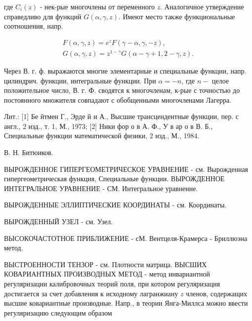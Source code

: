 \documentclass[10pt]{article}
\begin{document}
где $C_{i}(z)$ - нек-рые многочлены от переменного $z$. Аналогичное утверждение справедливо для функций $G(\alpha, \gamma, z)$. Имеют место также функциональные соотношения, напр.



\[

\begin{gathered}

F(\alpha, \gamma, z)=e^{z} F(\gamma-\alpha, \gamma,-z), \\

G(\alpha, \gamma, z)=z^{1-\gamma} G(\alpha-\gamma+1,2-\gamma, z) .

\end{gathered}

\]



Через В. г. ф. выражаются многие элементарные и специальные функции, напр. цилиндрич. функции, интегральные функции. При $\alpha=-n$, где $n-$ целое положительное число, В. г. Ф. сводятся к многочленам, к-рые с точностью до постоянного множителя совпадают с обобщенными многочленами Лагерра.



Лит.: [1] Бе йтмен Г., Эрде й и А., Высшие трансцендентные функции, пер. с англ., 2 изд., т. 1, М., 1973; [2] Ники фор о в А. Ф., У в ар о в В. Б., Специальные функции математической физики, 2 изд., М., 1984.



В. Н. Битюиков.



ВЫРОЖДЕННОЕ ГИПЕРГЕОМЕТРИЧЕСКОЕ УРАВНЕНИЕ - см. Вырожденная гипергеометрическая функция, Специальные функции. ВЫРОЖДЕННОЕ ИНТЕГРАЛЬНОЕ УРАВНЕНИЕ - СМ. Интегральное уравнение.



ВЫРОЖДЕННЫЕ ЭЛЛИПТИЧЕСКИЕ КООРДИНАТЫ - см. Координаты.



ВЫРОЖДЕННЫЙ УЗЕЛ - см. Узел.



ВЫСОКОЧАСТОТНОЕ ПРИБЛИЖЕНИЕ - сМ. Вентцеля-Крамерса - Бриллюэна метод.



ВЫСТРОЕННОСТИ ТЕНЗОР - см. Плотности матрица. ВЫСШИХ КОВАРИАНТНЫХ ПРОИЗВОДНЫХ МЕТОД - метод инвариантной регуляризации калибровочных теорий поля, при котором регуляризация достигается за счет добавления к исходному лагранжиану $z$ членов, содержащих высшие ковариантные производные. Напр., в теории Янга-Миллса можно ввести регуляризацию следующим образом
\end{document}
